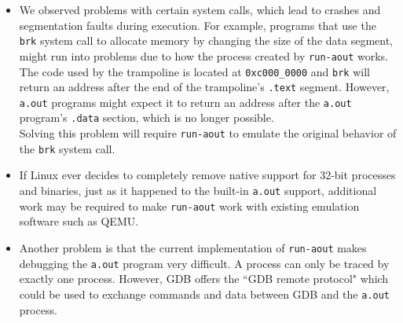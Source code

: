 \documentclass{article}
\begin{document}
\begin{itemize}
    \item We observed problems with certain system calls, which lead to crashes and segmentation faults during execution. For example, programs that use the \texttt{brk} system call to allocate memory by changing the size of the data segment, might run into problems due to how the process created by \texttt{run-aout} works.\\
    The code used by the trampoline is located at \texttt{0xc000\_0000} and \texttt{brk} will return an address after the end of the trampoline's \texttt{.text} segment. However, \texttt{a.out} programs might expect it to return an address after the \texttt{a.out} program's \texttt{.data} section, which is no longer possible.\\
    Solving this problem will require \texttt{run-aout} to emulate the original behavior of the \texttt{brk} system call.
    
    \item If Linux ever decides to completely remove native support for 32-bit processes and binaries, just as it happened to the built-in \texttt{a.out} support, additional work may be required to make \texttt{run-aout} work with existing emulation software such as QEMU.
    
    \item Another problem is that the current implementation of \texttt{run-aout} makes debugging the \texttt{a.out} program very difficult. A process can only be traced by exactly one process. However, GDB offers the ``GDB remote protocol" \cite{GDBRemoteProtocol} which could be used to exchange commands and data between GDB and the \texttt{a.out} process.
\end{itemize}

\newpage
\printbibliography

\newpage
\listoffigures

\listoftables

\lstlistoflistings
\end{document}
